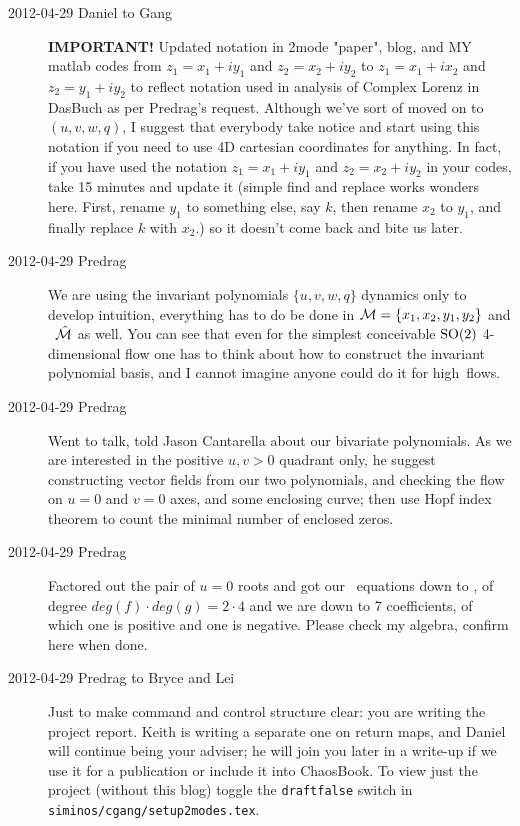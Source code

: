 \begin{description}
\item[2012-04-29 Daniel to Gang] {\bf \color{red}IMPORTANT!} Updated
notation in 2mode "paper", blog, and MY matlab codes from $z_1 = x_1 + i
y_1$ and $z_2=x_2 + i y_2$ to $z_1 = x_1 + i x_2$ and $z_2 = y_1+ i y_2$
to reflect notation used in analysis of Complex Lorenz in DasBuch as per
Predrag's request. Although we've sort of moved on to $(u,v,w,q)$, I
suggest that everybody take notice and start using this notation if you
need to use 4D cartesian coordinates for anything. In fact, if you have
used the notation $z_1 = x_1 + i y_1$ and $z_2=x_2 + i y_2$ in your
codes, take 15 minutes and update it (simple find and replace works
wonders here. First, rename $y_1$ to something else, say $k$, then rename
$x_2$ to $y_1$, and finally replace $k$ with $x_2$.) so it doesn't come
back and bite us later.

\item[2012-04-29 Predrag] We are using the invariant polynomials
$\{u,v,w,q\}$ dynamics only to develop intuition, everything has to do be
done in ${\cal M} = \{x_1,x_2,y_1,y_2\}$ and \slice\ $\hat{\cal M}$ as well. You can
see that even for the simplest conceivable $\textrm{SO}(2)$ 4-dimensional flow
one has to think about how to construct the invariant polynomial basis,
and I cannot imagine anyone could do it for high\dmn\ flows.

\item[2012-04-29 Predrag] Went to talk, told Jason Cantarella about our
bivariate polynomials. As we are interested in the positive $u,v > 0$
quadrant only, he suggest constructing vector fields from our two
polynomials, and checking the flow on $u=0$ and $v=0$ axes, and some
enclosing curve; then use Hopf index theorem to count the minimal number of
enclosed zeros.

\item[2012-04-29 Predrag] Factored out the pair of $u=0$ roots and got
our \reqv\ equations down to , of degree $deg(f) \cdot
deg(g) = 2 \cdot 4$ and we are down to 7 coefficients, of which one is
positive and one is negative. {\color{red}Please check my algebra},
confirm here when done.

\item[2012-04-29 Predrag to Bryce and Lei] Just to make command and
control structure clear: you are writing the \twoMode\
{project report}. Keith is writing a separate one on return maps, and
Daniel will continue being your adviser; he will join you later in a write-up
if we use it for a publication or include it into ChaosBook. To view just
the project (without this blog) toggle the \texttt{draftfalse} switch in
\texttt{siminos/cgang/setup2modes.tex}.


\end{description}
